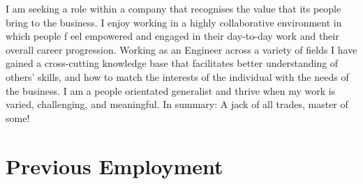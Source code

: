 \documentclass[]{deedy-resume-openfont-wjl}
\begin{document}
%
%


%
%
\vspace{-\topsep} %
\begin{center}
  \vspace{-\topsep} %
  \huge\color{subheadings}
\end{center}

I am seeking a role within a company that recognises the value that its people bring to the business.
I enjoy working in a highly collaborative environment in which people f eel empowered and engaged in their day-to-day work and their overall career progression.
Working as an Engineer across a variety of fields I have gained a cross-cutting knowledge base that facilitates better understanding of others' skills, and how to match the interests of the individual with the needs of the business.
I am a people orientated generalist and thrive when my work is varied, challenging, and meaningful.
\newline
In summary: A jack of all trades, master of some!

%
%
\sectionsep
\section{Previous Employment}










\end{document}
